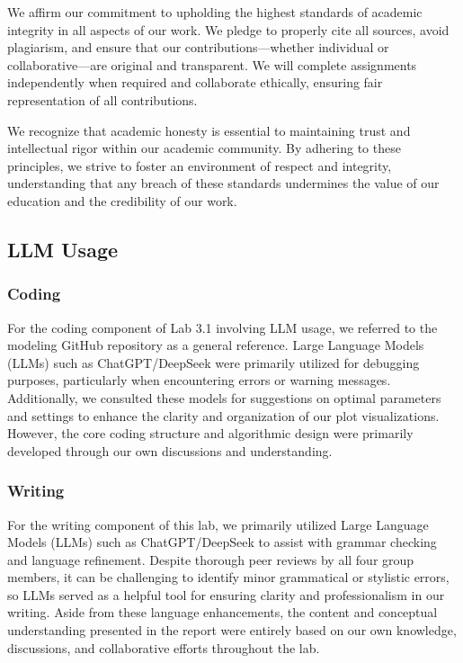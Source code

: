 \documentclass[11pt,letterpaper]{article}
\begin{document}
We affirm our commitment to upholding the highest standards of academic integrity in all aspects of our work. We pledge to properly cite all sources, avoid plagiarism, and ensure that our contributions—whether individual or collaborative—are original and transparent. We will complete assignments independently when required and collaborate ethically, ensuring fair representation of all contributions.

We recognize that academic honesty is essential to maintaining trust and intellectual rigor within our academic community. By adhering to these principles, we strive to foster an environment of respect and integrity, understanding that any breach of these standards undermines the value of our education and the credibility of our work.


\vspace{1em} %
\subsection{LLM Usage}
\vspace{0.5em} %

\subsubsection*{Coding}
\vspace{0.5em} %

For the coding component of Lab 3.1 involving LLM usage, we referred to the modeling GitHub repository as a general reference. Large Language Models (LLMs) such as ChatGPT/DeepSeek were primarily utilized for debugging purposes, particularly when encountering errors or warning messages. Additionally, we consulted these models for suggestions on optimal parameters and settings to enhance the clarity and organization of our plot visualizations. However, the core coding structure and algorithmic design were primarily developed through our own discussions and understanding.

\vspace{1em} %
\subsubsection*{Writing}
\vspace{0.5em} %

For the writing component of this lab, we primarily utilized Large Language Models (LLMs) such as ChatGPT/DeepSeek to assist with grammar checking and language refinement. Despite thorough peer reviews by all four group members, it can be challenging to identify minor grammatical or stylistic errors, so LLMs served as a helpful tool for ensuring clarity and professionalism in our writing. Aside from these language enhancements, the content and conceptual understanding presented in the report were entirely based on our own knowledge, discussions, and collaborative efforts throughout the lab.
\end{document}
